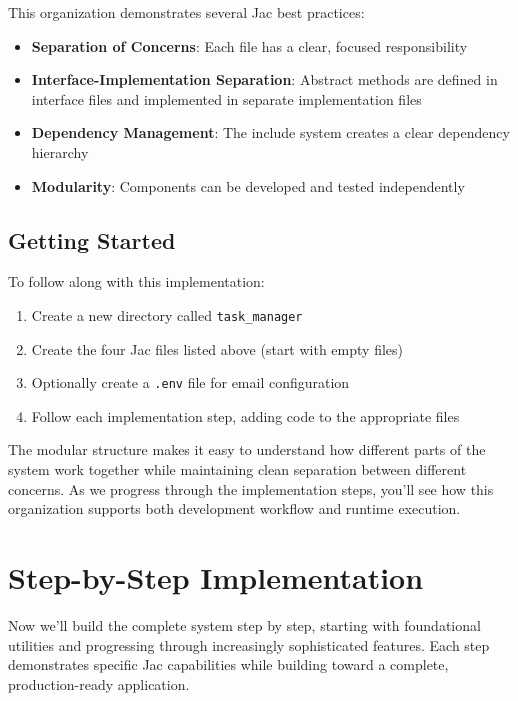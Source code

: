 This organization demonstrates several Jac best practices:

\begin{itemize}
\item \textbf{Separation of Concerns}: Each file has a clear, focused responsibility
\item \textbf{Interface-Implementation Separation}: Abstract methods are defined in interface files and implemented in separate implementation files
\item \textbf{Dependency Management}: The include system creates a clear dependency hierarchy
\item \textbf{Modularity}: Components can be developed and tested independently
\end{itemize}

\subsection{Getting Started}

To follow along with this implementation:

\begin{enumerate}
\item Create a new directory called \texttt{task\_manager}
\item Create the four Jac files listed above (start with empty files)
\item Optionally create a \texttt{.env} file for email configuration
\item Follow each implementation step, adding code to the appropriate files
\end{enumerate}

The modular structure makes it easy to understand how different parts of the system work together while maintaining clean separation between different concerns. As we progress through the implementation steps, you'll see how this organization supports both development workflow and runtime execution.

\section{Step-by-Step Implementation}

Now we'll build the complete system step by step, starting with foundational utilities and progressing through increasingly sophisticated features. Each step demonstrates specific Jac capabilities while building toward a complete, production-ready application.

